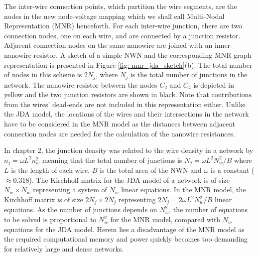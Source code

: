 The inter-wire connection points, which partition the wire segments, are the nodes in the new node-voltage mapping which we shall call Multi-Nodal Representation (MNR) henceforth. For each inter-wire junction, there are two connection nodes, one on each wire, and are connected by a junction resistor. Adjacent connection nodes on the same nanowire are joined with an inner-nanowire resistor. A sketch of a simple NWN and the corresponding MNR graph representation is presented in Figure \ref{fig: mnr_jda_sketch}(b). The total number of nodes in this scheme is $2 N_j$, where $N_j$ is the total number of junctions in the network. The nanowire resistor between the nodes $C_2$ and $C_4$ is depicted in yellow and the two junction resistors are shown in black. Note that contributions from the wires' dead-ends are not included in this representation either. Unlike the JDA model, the locations of the wires and their intersections in the network have to be considered in the MNR model as the distances between adjacent connection nodes are needed for the calculation of the nanowire resistances. 

In chapter 2, the junction density was related to the wire density in a network by $n_j = \omega L^2 n_w^2 $ meaning that the total number of junctions is $N_j = \omega L^2 N_w^2 / B$ where $L$ is the length of each wire, $B$ is the total area of the NWN and $\omega$ is a constant ($\approx 0.318$)\cite{ocallaco2016,kallmes1960,sampson2008}. The Kirchhoff matrix for the JDA model of a network is of size $N_w \times N_w$ representing a system of $N_w$ linear equations. In the MNR model, the Kirchhoff matrix is of size $2 N_j\times 2 N_j$ representing $2N_j = 2 \omega L^2 N_w^2/B$ linear equations. As the number of junctions depends on $N_w^2$, the number of equations to be solved is proportional to $N_w^2$ for the MNR model, compared with $N_w$ equations for the JDA model. Herein lies a disadvantage of the MNR model as the required computational memory and power quickly becomes too demanding for relatively large and dense networks.

